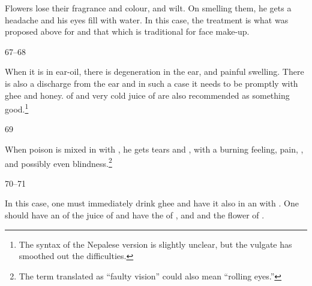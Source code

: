 \begin{translation}
Flowers lose their fragrance and colour, and wilt. On smelling them, he gets a
headache and his eyes fill with water.  In this case, the treatment is what was
proposed above for  and that which is traditional for face
make-up.


\item[67--68]

When it is in ear-oil, there is  degeneration in the ear, and painful swelling.
There is also a discharge from the ear and in such a case it needs to be
 promptly with ghee and honey.  
 of  and  very cold juice of
 are also  recommended as 
something good.\footnote{The syntax of the Nepalese version is slightly unclear, 
but the vulgate has smoothed out the difficulties.}


\item[69]

\newcommand{\plant}[4]{\se{#2}{#1}}


When poison is mixed in with , he gets tears and
, with a burning feeling, pain, , and possibly even blindness.\footnote{The term translated as  “faulty
vision” could also mean “rolling eyes.”}

\item[70--71]

In this case, one must immediately drink ghee and have it also
in an  with
.
%
One should have an  of the juice of
and have the  of 
,
 and 
and the flower of 
.


\end{translation}
